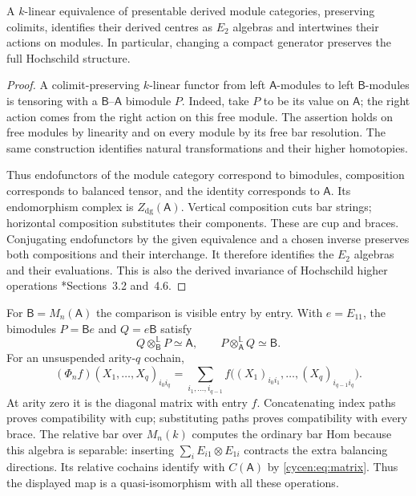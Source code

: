 \begin{theorem}\label{cycen:thm:morita}
A $k$-linear equivalence of presentable derived module
categories, preserving colimits, identifies their derived
centres as $E_2$ algebras and intertwines their actions on
modules. In particular, changing a compact generator preserves
the full Hochschild structure.
\end{theorem}
\begin{proof}
A colimit-preserving $k$-linear functor from left
$\mathsf A$-modules to left $\mathsf B$-modules is tensoring
with a $\mathsf B$--$\mathsf A$ bimodule $P$. Indeed, take
$P$ to be its value on $\mathsf A$; the right action comes
from the right action on this free module. The assertion
holds on free modules by linearity and on every module by
its free bar resolution. The same construction identifies
natural transformations and their higher homotopies.

Thus endofunctors of the module category correspond to
bimodules, composition corresponds to balanced tensor, and
the identity corresponds to $\mathsf A$. Its endomorphism
complex is $Z_{\mathrm{dg}}(\mathsf A)$. Vertical composition
cuts bar strings; horizontal composition substitutes their
components. These are cup and braces. Conjugating
endofunctors by the given equivalence and a chosen inverse
preserves both compositions and their interchange. It therefore
identifies the $E_2$ algebras and their evaluations. This is
also the derived invariance of Hochschild higher operations
\cite{cycen:KellerHigher}*{Sections~3.2 and~4.6}.
\end{proof}

For $\mathsf B=M_n(\mathsf A)$ the comparison is visible
entry by entry. With $e=E_{11}$, the bimodules
$P=\mathsf Be$ and $Q=e\mathsf B$ satisfy
\[
 Q\otimes_{\mathsf B}^{\mathbb L}P\simeq\mathsf A,
 \qquad P\otimes_{\mathsf A}^{\mathbb L}Q\simeq\mathsf B.
\]
For an unsuspended arity-$q$ cochain,
\begin{equation}\label{cycen:eq:matrix}
 (\Phi_nf)(X_1,\ldots,X_q)_{i_0i_q}
  =\sum_{i_1,\ldots,i_{q-1}}
   f\bigl((X_1)_{i_0i_1},\ldots,(X_q)_{i_{q-1}i_q}\bigr).
\end{equation}
At arity zero it is the diagonal matrix with entry $f$.
Concatenating index paths proves compatibility with cup;
substituting paths proves compatibility with every brace.
The relative bar over $M_n(k)$ computes the ordinary bar
Hom because this algebra is separable: inserting
$\sum_i E_{i1}\otimes E_{1i}$ contracts the extra balancing
directions. Its relative cochains identify with $C(\mathsf A)$
by \eqref{cycen:eq:matrix}. Thus the displayed map is a
quasi-isomorphism with all these operations.

